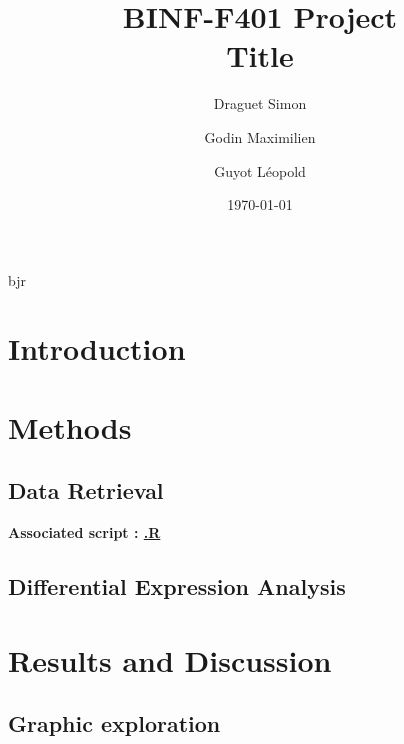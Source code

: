 \documentclass[a4paper, 11pt]{article}
\title{\Large BINF-F401 Project \\
\huge Title}
\author{
	Draguet Simon
	\and
	Godin Maximilien
	\and
	Guyot Léopold
	}
\date{\today}
\begin{document}
\pagestyle{fancy}
\setlength{\headheight}{32.3pt}
\fancyhead{}\fancyfoot{}
\fancyfoot[R]{\thepage}

\maketitle

\begin{multicols}{2}
	bjr
\section{Introduction}
\lipsum

\section{Methods}
\lipsum[4]
\subsection{Data Retrieval}
\begin{scriptsize}
	\textbf{Associated script : \href{https://github.com/leopoldguyot/BINF-F401-Project/*}{.R}}
\end{scriptsize}

\lipsum[4]
\subsection{Differential Expression Analysis}
\lipsum[4]

\section{Results and Discussion}
\lipsum
\subsection{Graphic exploration}
\lipsum[5]



\end{multicols}
\end{document}
